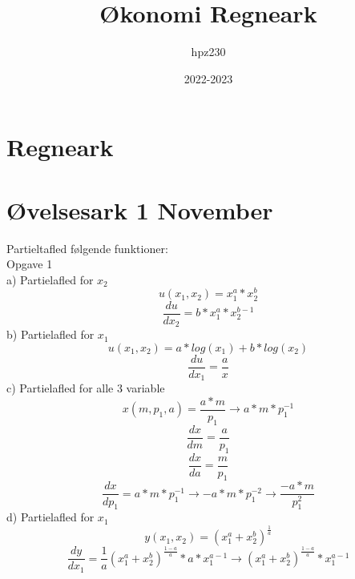 \documentclass{article}
\title{Økonomi Regneark}
\author{hpz230}
\date{2022-2023}
\begin{document}
\maketitle

\section*{Regneark}

\section{Øvelsesark 1 November}
Partieltafled følgende funktioner: \\
Opgave 1 \\
a) Partielafled for $x_2$ \\
\begin{equation}
    u(x_1,x_2)=x_1^a*x_2^b
\end{equation}
\begin{equation}
    \frac{du}{dx_2}=b*x_1^a*x_2^{b-1}
\end{equation}
b) Partielafled for $x_1$\\ 
\begin{equation}
     u(x_1,x_2)=a*log(x_1)+b*log(x_2)
\end{equation}
\begin{equation}
    \frac{du}{dx_1}=\frac{a}{x}
\end{equation}
c) Partielafled for alle 3 variable\\
\begin{equation}
     x(m,p_1,a)=\frac{a*m}{p_1}\longrightarrow a*m*p_1^{-1}
\end{equation}
\begin{equation}
    \frac{dx}{dm}=\frac{a}{p_1}
\end{equation}
\begin{equation}
    \frac{dx}{da}=\frac{m}{p_1}
\end{equation}
\begin{equation}
    \frac{dx}{dp_1}=a*m*p_1^{-1}\longrightarrow -a*m*p_1^{-2} \longrightarrow \frac{-a*m}{p_1^2}
\end{equation}
d) Partielafled for $x_1$ \\
\begin{equation}
     y(x_1,x_2)=(x_1^a+x_2^b)^{\frac{1}{a}}
\end{equation}
\begin{equation}
     \frac{dy}{dx_1}=\frac{1}{a}(x_1^a+x_2^b)^{\frac{1-a}{a}}*a*x_1^{a-1} \longrightarrow (x_1^a+x_2^b)^{\frac{1-a}{a}}*x_1^{a-1}
\end{equation}
\end{document}
